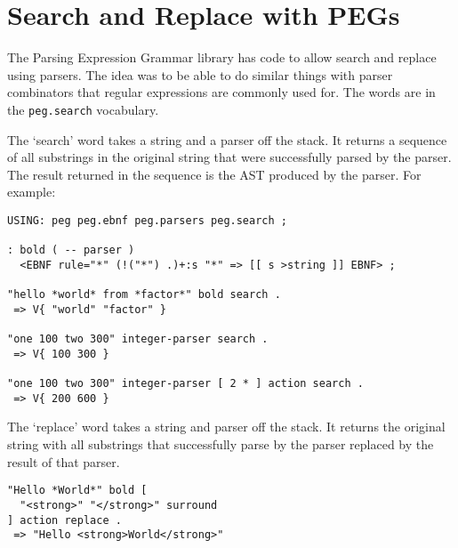 \chapter{Search and Replace with PEGs}\label{seachreplace}

The Parsing Expression Grammar library has code to allow search and replace using parsers. The idea was to be able to do similar things with parser combinators that regular expressions are commonly used for. The words are in the \texttt{peg.search} vocabulary.


The `search' word takes a string and a parser off the stack. It returns a sequence of all substrings in the original string that were successfully parsed by the parser. The result returned in the sequence is the AST produced by the parser. For example:

\begin{verbatim}
USING: peg peg.ebnf peg.parsers peg.search ;

: bold ( -- parser )
  <EBNF rule="*" (!("*") .)+:s "*" => [[ s >string ]] EBNF> ;

"hello *world* from *factor*" bold search . 
 => V{ "world" "factor" } 

"one 100 two 300" integer-parser search .
 => V{ 100 300 }

"one 100 two 300" integer-parser [ 2 * ] action search .
 => V{ 200 600 }
\end{verbatim}


The `replace' word takes a string and parser off the stack. It returns the original string with all substrings that successfully parse by the parser replaced by the result of that parser.

\begin{verbatim}
"Hello *World*" bold [ 
  "<strong>" "</strong>" surround
] action replace .
 => "Hello <strong>World</strong>"
\end{verbatim}


